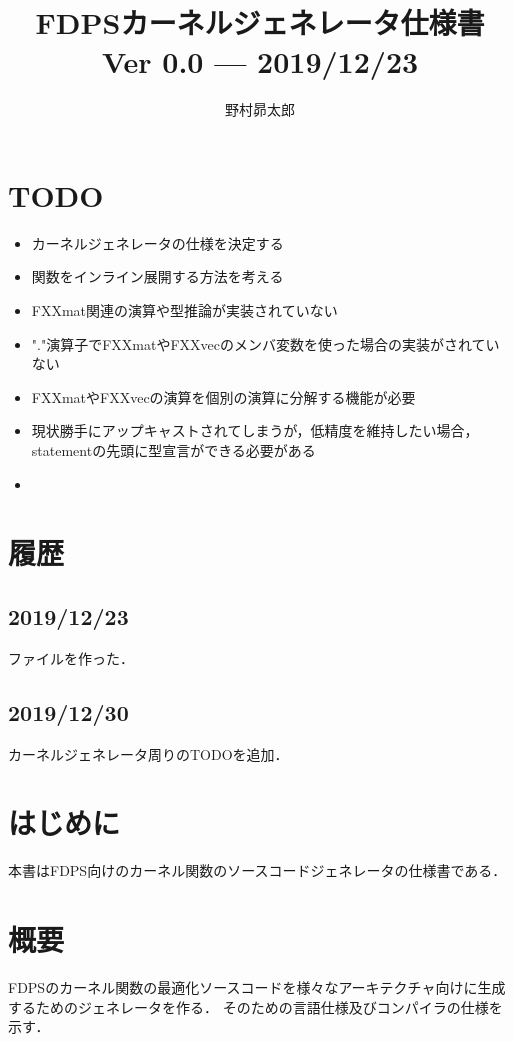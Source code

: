\documentclass{article}
\begin{document}
%
\title{FDPSカーネルジェネレータ仕様書\\
{\large 
Ver 0.0 --- 2019/12/23\\
}
}
\author{野村昴太郎}
\maketitle
\thispagestyle{empty}

\newpage
\tableofcontents
\newpage

\section{TODO}
 \begin{itemize}
  \item カーネルジェネレータの仕様を決定する
  \item 関数をインライン展開する方法を考える
  \item FXXmat関連の演算や型推論が実装されていない
  \item "."演算子でFXXmatやFXXvecのメンバ変数を使った場合の実装がされていない
  \item FXXmatやFXXvecの演算を個別の演算に分解する機能が必要
  \item 現状勝手にアップキャストされてしまうが，低精度を維持したい場合，statementの先頭に型宣言ができる必要がある
  \item 
 \end{itemize}
\section{履歴}
\label{sect:4}
\subsection{2019/12/23}
ファイルを作った．
\subsection{2019/12/30}
カーネルジェネレータ周りのTODOを追加．

\section{はじめに}
本書はFDPS向けのカーネル関数のソースコードジェネレータの仕様書である．

\section{概要}
FDPSのカーネル関数の最適化ソースコードを様々なアーキテクチャ向けに生成するためのジェネレータを作る．
そのための言語仕様及びコンパイラの仕様を示す．
\end{document}
